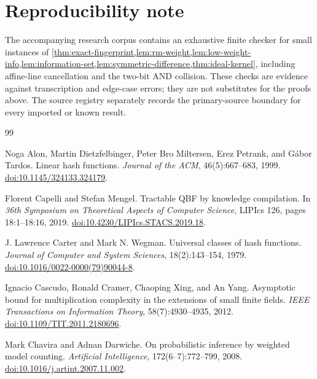 \documentclass[11pt]{article}
\theoremstyle{definition}
\theoremstyle{remark}
\begin{document}
\section*{Reproducibility note}

The accompanying research corpus contains an exhaustive finite checker for
small instances of
\cref{thm:exact-fingerprint,lem:rm-weight,lem:low-weight-info,lem:information-set,lem:symmetric-difference,thm:ideal-kernel},
including affine-line cancellation and the two-bit AND collision.  These
checks are evidence against transcription and
edge-case errors; they are not substitutes for the proofs above.  The source
registry separately records the primary-source boundary for every imported or
known result.

\begin{thebibliography}{99}

Noga Alon, Martin Dietzfelbinger, Peter Bro Miltersen, Erez Petrank, and
G\'abor Tardos.
\newblock Linear hash functions.
\newblock \emph{Journal of the ACM}, 46(5):667--683, 1999.
\newblock \href{https://doi.org/10.1145/324133.324179}{doi:10.1145/324133.324179}.

Florent Capelli and Stefan Mengel.
\newblock Tractable QBF by knowledge compilation.
\newblock In \emph{36th Symposium on Theoretical Aspects of Computer Science},
LIPIcs 126, pages 18:1--18:16, 2019.
\newblock \href{https://doi.org/10.4230/LIPIcs.STACS.2019.18}{doi:10.4230/LIPIcs.STACS.2019.18}.

J. Lawrence Carter and Mark N. Wegman.
\newblock Universal classes of hash functions.
\newblock \emph{Journal of Computer and System Sciences}, 18(2):143--154,
1979.
\newblock \href{https://doi.org/10.1016/0022-0000(79)90044-8}{doi:10.1016/0022-0000(79)90044-8}.

Ignacio Cascudo, Ronald Cramer, Chaoping Xing, and An Yang.
\newblock Asymptotic bound for multiplication complexity in the extensions of
small finite fields.
\newblock \emph{IEEE Transactions on Information Theory}, 58(7):4930--4935,
2012.
\newblock \href{https://doi.org/10.1109/TIT.2011.2180696}{doi:10.1109/TIT.2011.2180696}.

Mark Chavira and Adnan Darwiche.
\newblock On probabilistic inference by weighted model counting.
\newblock \emph{Artificial Intelligence}, 172(6--7):772--799, 2008.
\newblock \href{https://doi.org/10.1016/j.artint.2007.11.002}{doi:10.1016/j.artint.2007.11.002}.


\end{thebibliography}
\end{document}
